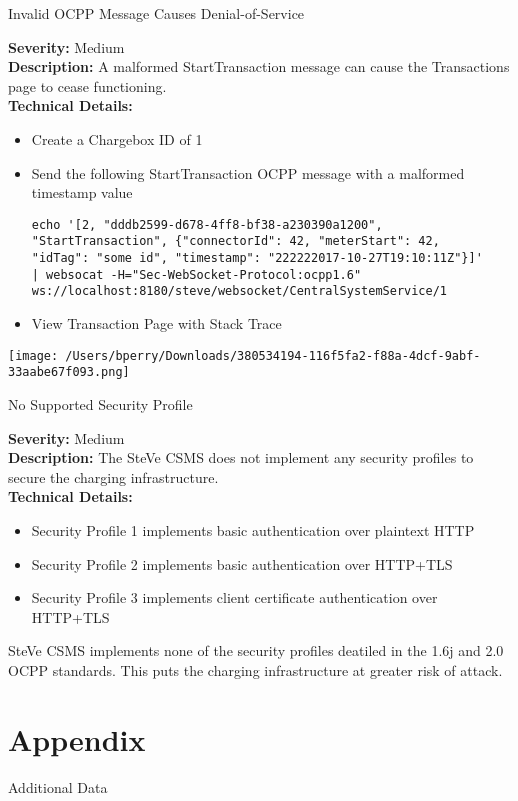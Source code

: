 \documentclass{scrartcl}
\begin{document}
\begin{yellowfindingbox}{Invalid OCPP Message Causes Denial-of-Service}
    \textbf{Severity:} Medium \\
    \textbf{Description:} A malformed StartTransaction message can cause the Transactions page to cease functioning. \\
    \textbf{Technical Details:}
    \begin{itemize}
        \item Create a Chargebox ID of 1
        \item Send the following StartTransaction OCPP message with a malformed timestamp value
          \begin{verbatim}
echo '[2, "dddb2599-d678-4ff8-bf38-a230390a1200", 
"StartTransaction", {"connectorId": 42, "meterStart": 42,
"idTag": "some id", "timestamp": "222222017-10-27T19:10:11Z"}]'
| websocat -H="Sec-WebSocket-Protocol:ocpp1.6" 
ws://localhost:8180/steve/websocket/CentralSystemService/1
          \end{verbatim}
        \item View Transaction Page with Stack Trace
    \end{itemize}
    \texttt{[image: /Users/bperry/Downloads/380534194-116f5fa2-f88a-4dcf-9abf-33aabe67f093.png]}
\end{yellowfindingbox}

\begin{yellowfindingbox}{No Supported Security Profile}
    \textbf{Severity:} Medium \\
    \textbf{Description:} The SteVe CSMS does not implement any security profiles to secure the charging infrastructure. \\
    \textbf{Technical Details:}
    \begin{itemize}
        \item Security Profile 1 implements basic authentication over plaintext HTTP
        \item Security Profile 2 implements basic authentication over HTTP+TLS
        \item Security Profile 3 implements client certificate authentication over HTTP+TLS
    \end{itemize}

SteVe CSMS implements none of the security profiles deatiled in the 1.6j and 2.0 OCPP standards. This puts the charging infrastructure at greater risk of attack.
\end{yellowfindingbox}

\newpage

\section*{Appendix}
\begin{sectionbox}{Additional Data}
    \lipsum[6] %
\end{sectionbox}
\end{document}
